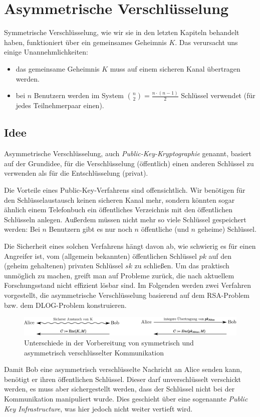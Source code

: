 \chapter{Asymmetrische Verschlüsselung}
\label{ch:asymmenc}

Symmetrische Verschlüsselung, wie wir sie in den letzten Kapiteln
behandelt haben, funktioniert über ein gemeinsames Geheimnis $K$.  Das
verursacht uns einige Unannehmlichkeiten:

\begin{itemize}
\item das gemeinsame Geheimnis $K$ muss auf einem sicheren Kanal
  übertragen werden.
\item bei $n$ Benutzern werden im System $\binom{n}{2} = \frac{n \cdot
    (n-1)}{2}$ Schlüssel verwendet (für jedes Teilnehmerpaar einen).
\end{itemize}

\section{Idee} Asymmetrische Verschlüsselung\indexEncryptionAsymm, auch
\emph{Public-Key-Kryptographie} genannt, basiert auf der Grundidee, für
die Verschlüsselung (öffentlich) einen anderen Schlüssel zu verwenden
als für die Entschlüsselung (privat).

Die Vorteile eines Public-Key-Verfahrens sind offensichtlich. Wir
benötigen für den Schlüsselaustausch keinen sicheren Kanal mehr, sondern
könnten sogar ähnlich einem Telefonbuch ein öffentliches Verzeichnis mit
den öffentlichen Schlüsseln anlegen. Außerdem müssen nicht mehr so viele
Schlüssel gespeichert werden: Bei $n$ Benutzern gibt es nur noch $n$
öffentliche (und $n$ geheime) Schlüssel.

Die Sicherheit eines solchen Verfahrens hängt davon ab, wie schwierig es
für einen Angreifer ist, vom (allgemein bekannten) öffentlichen
Schlüssel $pk$ auf den (geheim gehaltenen) privaten Schlüssel $sk$ zu
schließen. Um das praktisch unmöglich zu machen, greift man auf Probleme
zurück, die nach aktuellem Forschungsstand nicht effizient lösbar
sind. Im Folgenden werden zwei Verfahren vorgestellt, die asymmetrische
Verschlüsselung basierend auf dem RSA-Problem bzw. dem DLOG-Problem
konstruieren.

\begin{figure}
  \includegraphics[width=\textwidth]{images/vergleich-symmetrisch-asymmetrisch.eps}
  \caption{Unterschiede in der Vorbereitung von symmetrisch und
    asymmetrisch verschlüsselter Kommunikation}
  \label{fig:asymmenc-symmenc}
\end{figure} Damit Bob eine asymmetrisch verschlüsselte Nachricht an
Alice senden kann, benötigt er ihren öffentlichen Schlüssel. Dieser darf
unverschlüsselt verschickt werden, es muss aber sichergestellt werden,
dass der Schlüssel nicht bei der Kommunikation manipuliert wurde. Dies
geschieht über eine sogenannte \textit{Public Key Infrastructure}, was
hier jedoch nicht weiter vertieft wird.
